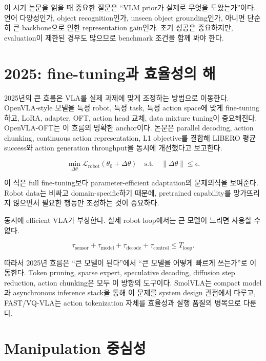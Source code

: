 이 시기 논문을 읽을 때 중요한 질문은 ``VLM prior가 실제로 무엇을 도왔는가''이다. 언어 다양성인가, object recognition인가, unseen object grounding인가, 아니면 단순히 큰 backbone으로 인한 representation gain인가. 초기 성공은 중요하지만, evaluation이 제한된 경우도 많으므로 benchmark 조건을 함께 봐야 한다.

\section{2025: fine-tuning과 효율성의 해}

2025년의 큰 흐름은 VLA를 실제 과제에 맞게 조정하는 방법으로 이동한다. OpenVLA-style 모델을 특정 robot, 특정 task, 특정 action space에 맞게 fine-tuning하고, LoRA, adapter, OFT, action head 교체, data mixture tuning이 중요해진다. OpenVLA-OFT는 이 흐름의 명확한 anchor이다. 논문은 parallel decoding, action chunking, continuous action representation, L1 objective를 결합해 LIBERO 평균 success와 action generation throughput을 동시에 개선했다고 보고한다.

\begin{equation}
  \min_{\Delta\theta}
  \mathcal{L}_{\mathrm{robot}}
  (\theta_0+\Delta\theta)
  \quad
  \mathrm{s.t.}
  \quad
  \|\Delta\theta\| \le \epsilon.
\end{equation}

이 식은 full fine-tuning보다 parameter-efficient adaptation의 문제의식을 보여준다. Robot data는 비싸고 domain-specific하기 때문에, pretrained capability를 망가뜨리지 않으면서 필요한 행동만 조정하는 것이 중요하다.

동시에 efficient VLA가 부상한다. 실제 robot loop에서는 큰 모델이 느리면 사용할 수 없다.

\begin{equation}
  \tau_{\mathrm{sensor}}
  +
  \tau_{\mathrm{model}}
  +
  \tau_{\mathrm{decode}}
  +
  \tau_{\mathrm{control}}
  \le
  T_{\mathrm{loop}}.
\end{equation}

따라서 2025년 흐름은 ``큰 모델이 된다''에서 ``큰 모델을 어떻게 빠르게 쓰는가''로 이동한다. Token pruning, sparse expert, speculative decoding, diffusion step reduction, action chunking은 모두 이 방향의 도구이다. SmolVLA는 compact model과 asynchronous inference stack을 통해 이 문제를 system design 관점에서 다루고, FAST/VQ-VLA는 action tokenization 자체를 효율성과 실행 품질의 병목으로 다룬다.

\section{Manipulation 중심성}

